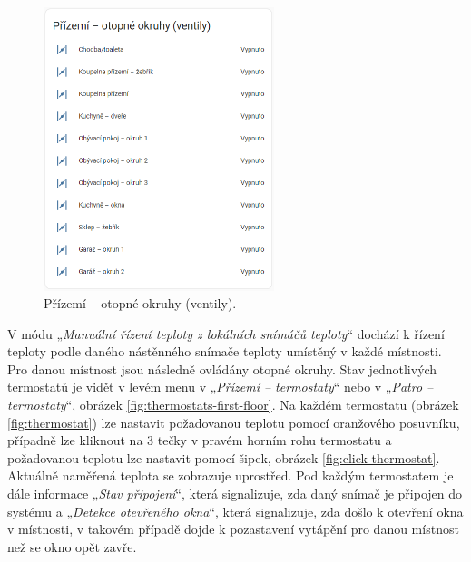 \begin{Czech}
\begin{figure}[H]
    \centering
    \includegraphics[width=0.6\textwidth]{pictures/czech/software/heating-circuits-ground-floor.png}
    \caption{Přízemí – otopné okruhy (ventily).}
    \label{fig:heating-circuits-ground-floor}
\end{figure}
\end{Czech}

\begin{Czech}
\end{Czech}


\begin{Czech}
\end{Czech}

\begin{Czech}
V módu „\textit{Manuální řízení teploty z lokálních snímáčů teploty}“ dochází k řízení teploty podle daného nástěnného snímače teploty umístěný v každé místnosti. Pro danou místnost jsou následně ovládány otopné okruhy. Stav jednotlivých termostatů je vidět v levém menu v „\textit{Přízemí – termostaty}“ nebo v „\textit{Patro – termostaty}“, obrázek \ref{fig:thermostats-first-floor}. Na každém termostatu (obrázek \ref{fig:thermostat}) lze nastavit požadovanou teplotu pomocí oranžového posuvníku, případně lze kliknout na 3 tečky v pravém horním rohu termostatu a požadovanou teplotu lze nastavit pomocí šipek, obrázek \ref{fig:click-thermostat}. Aktuálně naměřená teplota se zobrazuje uprostřed. Pod každým termostatem je dále informace „\textit{Stav připojení}“, která signalizuje, zda daný snímač je připojen do systému a „\textit{Detekce otevřeného okna}“, která signalizuje, zda došlo k otevření okna v místnosti, v takovém případě dojde k pozastavení vytápění pro danou místnost než se okno opět zavře.
\end{Czech}

